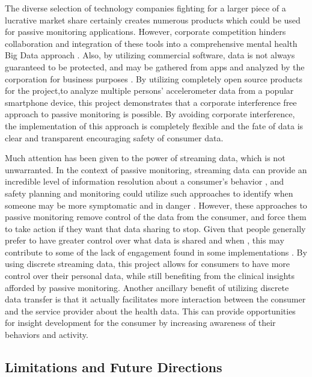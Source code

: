 \documentclass[sigconf]{acmart}
\begin{document}
The diverse selection of technology companies fighting for a larger piece of a lucrative market share certainly creates numerous products which could be used for passive monitoring applications. However, corporate competition hinders collaboration and integration of these tools into a comprehensive mental health Big Data approach \cite{openinfrastructure}. Also, by utilizing commercial software, data is not always guaranteed to be protected, and may be gathered from apps and analyzed by the corporation for business purposes \cite{bigdatabipolar}. By utilizing completely open source products for the project,to analyze multiple persons' accelerometer data from a popular smartphone device, this project demonstrates that a corporate interference free approach to passive monitoring is possible. By avoiding corporate interference, the implementation of this approach is completely flexible and the fate of data is clear and transparent encouraging safety of consumer data.

Much attention has been given to the power of streaming data, which is not unwarranted. In the context of passive monitoring, streaming data can provide an incredible level of information resolution about a consumer's behavior \cite{openinfrastructure}, and safety planning and monitoring could utilize such approaches to identify when someone may be more symptomatic and in danger \cite{bitreview}. However, these approaches to passive monitoring remove control of the data from the consumer, and force them to take action if they want that data sharing to stop. Given that people generally prefer to have greater control over what data is shared and when \cite{privacypreference}, this may contribute to some of the lack of engagement found in some implementations \cite{bitreview}. By using discrete  streaming data, this project allows for consumers to have more control over their personal data, while still benefiting from the clinical insights afforded by passive monitoring. Another ancillary benefit of utilizing discrete data transfer is that it actually facilitates more interaction between the consumer and the service provider about the health data. This can provide opportunities for insight development for the consumer by increasing awareness of their behaviors and activity.

\subsection{Limitations and Future Directions}
\end{document}
